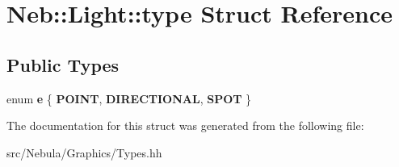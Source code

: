 \hypertarget{structNeb_1_1Light_1_1type}{\section{\-Neb\-:\-:\-Light\-:\-:type \-Struct \-Reference}
\label{structNeb_1_1Light_1_1type}
}
\subsection*{\-Public \-Types}
\begin{DoxyCompactItemize}
\item 
enum {\bfseries e} \{ {\bfseries \-P\-O\-I\-N\-T}, 
{\bfseries \-D\-I\-R\-E\-C\-T\-I\-O\-N\-A\-L}, 
{\bfseries \-S\-P\-O\-T}
 \}
\end{DoxyCompactItemize}


\-The documentation for this struct was generated from the following file\-:\begin{DoxyCompactItemize}
\item 
src/\-Nebula/\-Graphics/\-Types.\-hh\end{DoxyCompactItemize}
